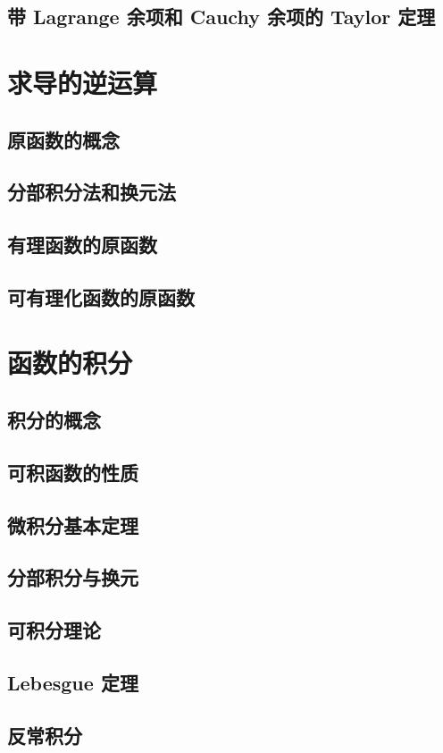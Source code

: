 \documentclass[a4paper, 11pt]{ctexbook}
\begin{document}
        \section{带 Lagrange 余项和 Cauchy 余项的 Taylor 定理}
    \chapter{求导的逆运算}
        \section{原函数的概念}
        \section{分部积分法和换元法}
        \section{有理函数的原函数}
        \section{可有理化函数的原函数}
    \chapter{函数的积分}
        \section{积分的概念}
        \section{可积函数的性质}
        \section{微积分基本定理}
        \section{分部积分与换元}
        \section{可积分理论}
        \section{Lebesgue 定理}
        \section{反常积分}
\end{document}

